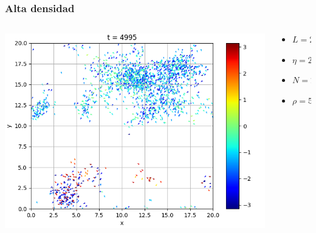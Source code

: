 \begin{frame}
\frametitle{Alta densidad}

\begin{columns}
    \begin{column}{0.7\textwidth}
      \begin{center}
{}
{\includegraphics[width=0.7\linewidth]{animation/high_density/plot_1000.png}}
\end{center}
    \end{column}
    \begin{column}{0.3\textwidth}
\begin{center}
            \footnotesize
        \begin{itemize}
        \item \(L = 20\)
        \item \(\eta = 2.5\)
        \item \(N = 2000\)
        \item \(\rho = 5\)
        \end{itemize}
\end{center}
    \end{column}
\end{columns}
\end{frame}

